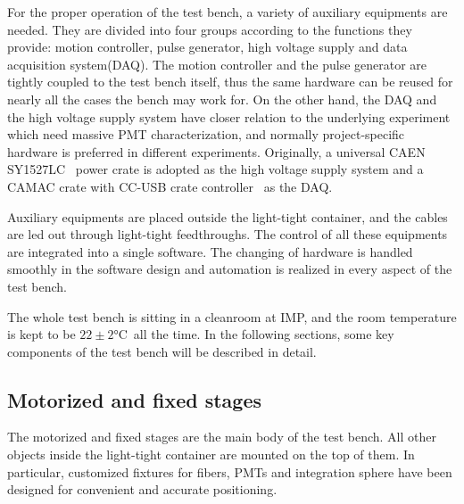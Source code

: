 \documentclass[a4paper,10pt,twoside]{cpc-hepnp}
\begin{document}
\begin{multicols}{2}
	
For the proper operation of the test bench, a variety of auxiliary equipments are needed. 
They are divided into four groups according to the functions they provide: motion controller, pulse generator, high voltage supply and data acquisition system(DAQ).
The motion controller and the pulse generator are tightly coupled to the test bench itself, thus the same hardware can be reused for nearly all the cases the bench may work for.
On the other hand, the DAQ and the high voltage supply system have closer relation to the underlying experiment which need massive PMT characterization, and normally project-specific hardware is preferred in different experiments. 
Originally, a universal CAEN SY1527LC~\citep{sy1527lc} power crate is adopted as the high voltage supply system and a CAMAC crate with CC-USB crate controller~\citep{cc_usb} as the DAQ.

Auxiliary equipments are placed outside the light-tight container, and the cables are led out through light-tight feedthroughs.
The control of all these equipments are integrated into a single software. The changing of hardware is handled smoothly in the software design and automation is realized in every aspect of the test bench.

The whole test bench is sitting in a cleanroom at IMP, and the room temperature is kept to be $22\pm2$\si{\celsius}~all the time. 
In the following sections, some key components of the test bench will be described in detail.

\subsection{Motorized and fixed stages}
\label{sec:stages}

The motorized and fixed stages are the main body of the test bench.
All other objects inside the light-tight container are mounted on the top of them.
In particular, customized fixtures for fibers, PMTs and integration sphere have been designed for convenient and accurate positioning.


\end{multicols}
\end{document}
